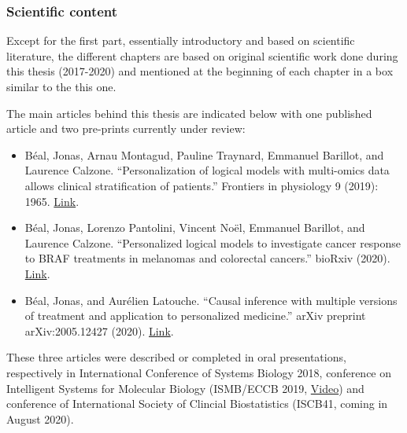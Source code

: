 \documentclass[a4paper,12pt,twoside,onecolumn,openright,final,oldfontcommands]{memoir}
\providecommand{\tightlist}{%
  \setlength{\itemsep}{0pt}\setlength{\parskip}{0pt}}
\newcommand{\clearemptydoublepage}{\newpage{\thispagestyle{empty}\cleardoublepage}}
\let\BeginKnitrBlock\begin \let\EndKnitrBlock\end
\begin{document}
\BeginKnitrBlock{summarybox}
\subsubsection*{Scientific content}\label{scientific-content}

Except for the first part, essentially introductory and based on
scientific literature, the different chapters are based on original
scientific work done during this thesis (2017-2020) and mentioned at the
beginning of each chapter in a box similar to the this one.

The main articles behind this thesis are indicated below with one
published article and two pre-prints currently under review:

\begin{itemize}
\tightlist
\item
  Béal, Jonas, Arnau Montagud, Pauline Traynard, Emmanuel Barillot, and
  Laurence Calzone. ``Personalization of logical models with multi-omics
  data allows clinical stratification of patients.'' Frontiers in
  physiology 9 (2019): 1965.
  \href{https://www.frontiersin.org/articles/10.3389/fphys.2018.01965/full}{Link}.
\item
  Béal, Jonas, Lorenzo Pantolini, Vincent Noël, Emmanuel Barillot, and
  Laurence Calzone. ``Personalized logical models to investigate cancer
  response to BRAF treatments in melanomas and colorectal cancers.''
  bioRxiv (2020).
  \href{https://www.biorxiv.org/content/10.1101/2020.05.27.119016v2}{Link}.
\item
  Béal, Jonas, and Aurélien Latouche. ``Causal inference with multiple
  versions of treatment and application to personalized medicine.''
  arXiv preprint arXiv:2005.12427 (2020).
  \href{https://arxiv.org/abs/2005.12427}{Link}.
\end{itemize}

These three articles were described or completed in oral presentations,
respectively in International Conference of Systems Biology 2018,
conference on Intelligent Systems for Molecular Biology (ISMB/ECCB 2019,
\href{https://www.youtube.com/watch?v=6EMBycoR0Ow}{Video}) and
conference of International Society of Clincial Biostatistics (ISCB41,
coming in August 2020).
\EndKnitrBlock{summarybox}

\clearemptydoublepage

\renewcommand{\contentsname}{Table of contents}

\end{document}
